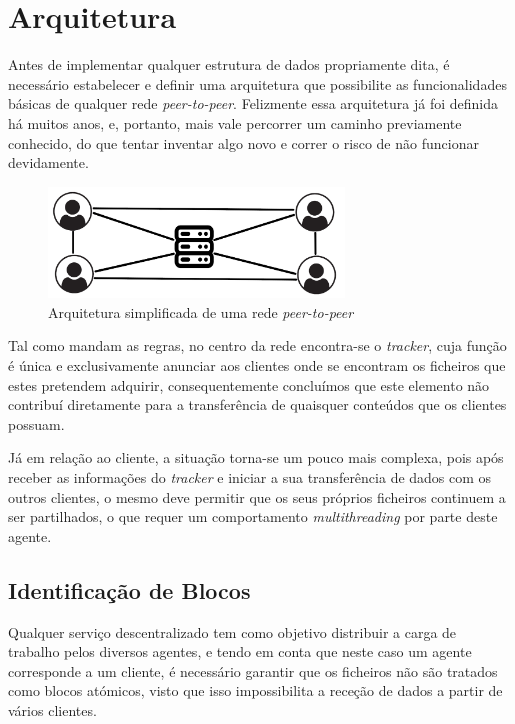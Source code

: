 \section{Arquitetura}

    Antes de implementar qualquer estrutura de dados propriamente dita, é necessário estabelecer e definir uma arquitetura que possibilite as funcionalidades básicas de qualquer rede \textit{peer-to-peer}. Felizmente essa arquitetura já foi definida há muitos anos, e, portanto, mais vale percorrer um caminho previamente conhecido, do que tentar inventar algo novo e correr o risco de não funcionar devidamente.

    \begin{figure}[hb!]
        \centering
        \includegraphics[width=0.7\textwidth]{Imagens/Estruturas/peer-to-peer.png}
        \caption{Arquitetura simplificada de uma rede \textit{peer-to-peer}}
    \end{figure}

    Tal como mandam as regras, no centro da rede encontra-se o \textit{tracker}, cuja função é única e exclusivamente anunciar aos clientes onde se encontram os ficheiros que estes pretendem adquirir, consequentemente concluímos que este elemento não contribuí diretamente para a transferência de quaisquer conteúdos que os clientes possuam.

    Já em relação ao cliente, a situação torna-se um pouco mais complexa, pois após receber as informações do \textit{tracker} e iniciar a sua transferência de dados com os outros clientes, o mesmo deve permitir que os seus próprios ficheiros continuem a ser partilhados, o que requer um comportamento \textit{multithreading} por parte deste agente.

    \subsection{Identificação de Blocos}

        Qualquer serviço descentralizado tem como objetivo distribuir a carga de trabalho pelos diversos agentes, e tendo em conta que neste caso um agente corresponde a um cliente, é necessário garantir que os ficheiros não são tratados como blocos atómicos, visto que isso impossibilita a receção de dados a partir de vários clientes.

